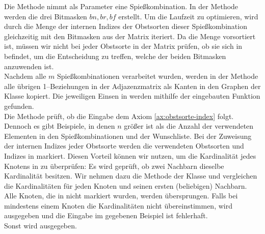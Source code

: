 Die Methode  nimmt als Parameter eine Spießkombination. 
In der Methode werden die drei Bitmasken $bn, br, bf$ erstellt.
Um die Laufzeit zu optimieren, wird durch die Menge der internen Indizes der Obstsorten 
dieser Spießkombination  gleichzeitig mit den Bitmasken aus der Matrix iteriert.
Da die Menge  vorsortiert ist, müssen wir nicht bei jeder Obstsorte in der Matrix
prüfen, ob sie sich in  befindet, um die Entscheidung zu treffen, welche der beiden
Bitmasken anzuwenden ist.\\
Nachdem alle $m$ Spießkombinationen verarbeitet wurden, werden in der Methode 
alle übrigen 1--Beziehungen in der Adjazenzmatrix
als Kanten in den Graphen  der Klasse  kopiert. 
Die jeweiligen Einsen in  werden mithilfe der eingebauten Funktion 
gefunden.\\

Die Methode  prüft, ob die Eingabe dem Axiom \ref{ax:obstsorte-index} folgt.
Dennoch es gibt Beispiele, in denen $n$ größer ist als die Anzahl der verwendeten Elementen in den
Spießkombinationen und der Wunschliste.
Bei der Zuweisung der internen Indizes jeder Obstsorte werden die verwendeten Obstsorten und Indizes
in  markiert. Diesen Vorteil können wir nutzen, um die Kardinalität
jedes Knotens in  zu überprüfen: Es wird geprüft, ob zwei Nachbarn dieselbe Kardinalität besitzen.
Wir nehmen dazu die Methode  der Klasse  und vergleichen die
Kardinalitäten für jeden Knoten und seinen ersten (beliebigen) Nachbarn. 
Alle Knoten, die in  nicht markiert wurden, werden übersprungen.
Falls bei mindestens einem Knoten die Kardinalitäten nicht übereinstimmen, wird  ausgegeben und
die Eingabe im gegebenen Beispiel ist fehlerhaft.\\
Sonst wird  ausgegeben.\\ 

